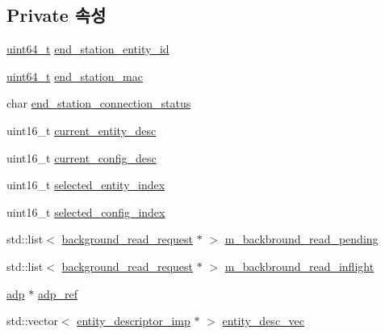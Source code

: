 \subsection*{Private 속성}
\begin{DoxyCompactItemize}
\item 
\hyperlink{parse_8c_aec6fcb673ff035718c238c8c9d544c47}{uint64\+\_\+t} \hyperlink{classavdecc__lib_1_1end__station__imp_ac32ac278fb799e1b4f0cd539e0abe2b5}{end\+\_\+station\+\_\+entity\+\_\+id}
\item 
\hyperlink{parse_8c_aec6fcb673ff035718c238c8c9d544c47}{uint64\+\_\+t} \hyperlink{classavdecc__lib_1_1end__station__imp_a0e9fa7b31d903107ff9e7aac9dac172d}{end\+\_\+station\+\_\+mac}
\item 
char \hyperlink{classavdecc__lib_1_1end__station__imp_ac5fdc13743115b94ade40fd1a74e97c3}{end\+\_\+station\+\_\+connection\+\_\+status}
\item 
uint16\+\_\+t \hyperlink{classavdecc__lib_1_1end__station__imp_afd78c89df26ba7641e1adb764c0e827d}{current\+\_\+entity\+\_\+desc}
\item 
uint16\+\_\+t \hyperlink{classavdecc__lib_1_1end__station__imp_a60b1af40d35e8a86b0082c54ab6cb6a8}{current\+\_\+config\+\_\+desc}
\item 
uint16\+\_\+t \hyperlink{classavdecc__lib_1_1end__station__imp_ad6eff78fc51bad1b962873657f069eaa}{selected\+\_\+entity\+\_\+index}
\item 
uint16\+\_\+t \hyperlink{classavdecc__lib_1_1end__station__imp_a6c67b72a9169716135fa381869fe6bd7}{selected\+\_\+config\+\_\+index}
\item 
std\+::list$<$ \hyperlink{classavdecc__lib_1_1background__read__request}{background\+\_\+read\+\_\+request} $\ast$ $>$ \hyperlink{classavdecc__lib_1_1end__station__imp_af2ab09d6e9373db122f0646f7a9e1eb9}{m\+\_\+backbround\+\_\+read\+\_\+pending}
\item 
std\+::list$<$ \hyperlink{classavdecc__lib_1_1background__read__request}{background\+\_\+read\+\_\+request} $\ast$ $>$ \hyperlink{classavdecc__lib_1_1end__station__imp_adc3620b385a00867b72dbfbcf6c839db}{m\+\_\+backbround\+\_\+read\+\_\+inflight}
\item 
\hyperlink{classavdecc__lib_1_1adp}{adp} $\ast$ \hyperlink{classavdecc__lib_1_1end__station__imp_a0b7b5ce956637a18c695ba20f2d4908c}{adp\+\_\+ref}
\item 
std\+::vector$<$ \hyperlink{classavdecc__lib_1_1entity__descriptor__imp}{entity\+\_\+descriptor\+\_\+imp} $\ast$ $>$ \hyperlink{classavdecc__lib_1_1end__station__imp_a72edab41bc56e3c1757944a7df188a3d}{entity\+\_\+desc\+\_\+vec}
\end{DoxyCompactItemize}


